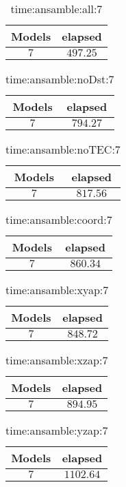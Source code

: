 \begin{table}[!ht]
	\centering
	\begin{tabular}{|c|c|}
		\hline
		Models & elapsed \\ \hline
		$7$ & $497.25$ \\ \hline
	\end{tabular}
	\caption{time:ansamble:all:7}
	\label{tab:time:ansamble:all:7}
\end{table}

\begin{table}[!ht]
	\centering
	\begin{tabular}{|c|c|}
		\hline
		Models & elapsed \\ \hline
		$7$ & $794.27$ \\ \hline
	\end{tabular}
	\caption{time:ansamble:noDst:7}
	\label{tab:time:ansamble:noDst:7}
\end{table}

\begin{table}[!ht]
	\centering
	\begin{tabular}{|c|c|}
		\hline
		Models & elapsed \\ \hline
		$7$ & $817.56$ \\ \hline
	\end{tabular}
	\caption{time:ansamble:noTEC:7}
	\label{tab:time:ansamble:noTEC:7}
\end{table}

\begin{table}[!ht]
	\centering
	\begin{tabular}{|c|c|}
		\hline
		Models & elapsed \\ \hline
		$7$ & $860.34$ \\ \hline
	\end{tabular}
	\caption{time:ansamble:coord:7}
	\label{tab:time:ansamble:coord:7}
\end{table}

\begin{table}[!ht]
	\centering
	\begin{tabular}{|c|c|}
		\hline
		Models & elapsed \\ \hline
		$7$ & $848.72$ \\ \hline
	\end{tabular}
	\caption{time:ansamble:xyap:7}
	\label{tab:time:ansamble:xyap:7}
\end{table}

\begin{table}[!ht]
	\centering
	\begin{tabular}{|c|c|}
		\hline
		Models & elapsed \\ \hline
		$7$ & $894.95$ \\ \hline
	\end{tabular}
	\caption{time:ansamble:xzap:7}
	\label{tab:time:ansamble:xzap:7}
\end{table}

\begin{table}[!ht]
	\centering
	\begin{tabular}{|c|c|}
		\hline
		Models & elapsed \\ \hline
		$7$ & $1102.64$ \\ \hline
	\end{tabular}
	\caption{time:ansamble:yzap:7}
	\label{tab:time:ansamble:yzap:7}
\end{table}
